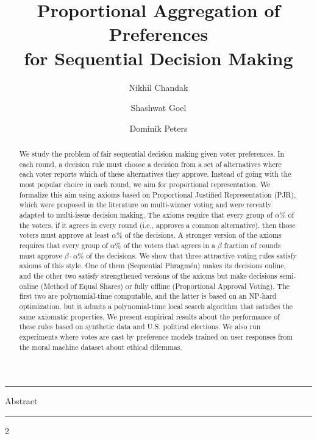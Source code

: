 \documentclass[10pt]{scrartcl}
\author[1]{Nikhil Chandak}
\author[1]{Shashwat Goel}
\author[2]{Dominik Peters}
\affil[1]{IIIT Hyderabad}
\affil[2]{CNRS, LAMSADE, Universit\'e Paris Dauphine - PSL}
\date{\vspace{-20pt}}
\title{Proportional Aggregation of Preferences \\ for Sequential Decision Making}
\theoremstyle{plain}
\theoremstyle{definition}
\begin{document}
\newpage
\maketitle

\vspace{-7pt}
\hrule
\vspace{5pt}

\begin{center}
	\textsf{Abstract}
\end{center}

\begin{abstract}
    We study the problem of fair sequential decision making given voter preferences. In each round, a decision rule must choose a decision from a set of alternatives where each voter reports which of these alternatives they approve. Instead of going with the most popular choice in each round, we aim for proportional representation. We formalize this aim using axioms based on Proportional Justified Representation (PJR), which were proposed in the literature on multi-winner voting and were recently adapted to multi-issue decision making. The axioms require that every group of $\alpha\%$ of the voters, if it agrees in every round (i.e., approves a common alternative), then those voters must approve at least $\alpha\%$ of the decisions. A stronger version of the axioms requires that every group of $\alpha\%$ of the voters that agrees in a $\beta$ fraction of rounds must approve $\beta\cdot\alpha\%$ of the decisions. We show that three attractive voting rules satisfy axioms of this style. One of them (Sequential Phragm\'en) makes its decisions online, and the other two satisfy strengthened versions of the axioms but make decisions semi-online (Method of Equal Shares) or fully offline (Proportional Approval Voting). The first two are polynomial-time computable, and the latter is based on an NP-hard optimization, but it admits a polynomial-time local search algorithm that satisfies the same axiomatic properties. We present empirical results about the performance of these rules based on synthetic data and U.S. political elections. We also run experiments where votes are cast by preference models trained on user responses from the moral machine dataset about ethical dilemmas.
\end{abstract}

\vspace{10pt}

\hrule

\vspace{5pt}
{
\setlength\columnsep{17pt}
\setcounter{tocdepth}{2}
\renewcommand\contentsname{\vspace{-20pt}}
\begin{multicols}{2}
	{\footnotesize
	\tableofcontents}
\end{multicols}
}
\end{document}
